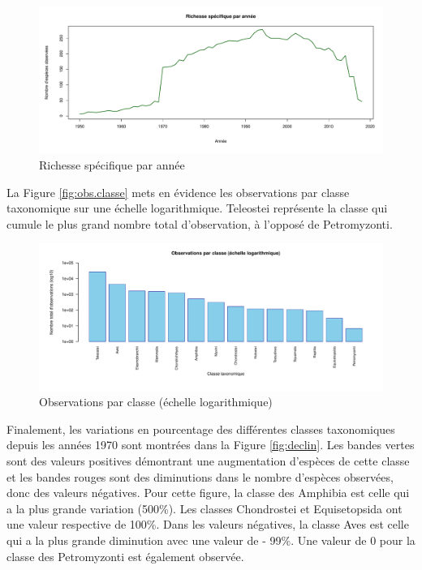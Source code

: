 \documentclass[9pt,twocolumn,twoside,]{pnas-new}
\begin{document}
\begin{figure}
\includegraphics[width=1\linewidth]{../Figures/figure_1_esp_par_annee} \caption{\label{fig:esp.annee} Richesse spécifique par année}\label{fig:fig.esp.annee}
\end{figure}

La Figure \ref{fig:obs.classe} mets en évidence les observations par
classe taxonomique sur une échelle logarithmique. Teleostei représente
la classe qui cumule le plus grand nombre total d'observation, à
l'opposé de Petromyzonti.

\begin{figure}
\includegraphics[width=1\linewidth]{../Figures/figure_2_obs_par_classe} \caption{\label{fig:obs.classe} Observations par classe (échelle logarithmique)}\label{fig:fig.obs.classe}
\end{figure}

Finalement, les variations en pourcentage des différentes classes
taxonomiques depuis les années 1970 sont montrées dans la Figure
\ref{fig:declin}. Les bandes vertes sont des valeurs positives
démontrant une augmentation d'espèces de cette classe et les bandes
rouges sont des diminutions dans le nombre d'espèces observées, donc des
valeurs négatives. Pour cette figure, la classe des Amphibia est celle
qui a la plus grande variation (500\%). Les classes Chondrostei et
Equisetopsida ont une valeur respective de 100\%. Dans les valeurs
négatives, la classe Aves est celle qui a la plus grande diminution avec
une valeur de - 99\%. Une valeur de 0 pour la classe des Petromyzonti
est également observée.
\end{document}
